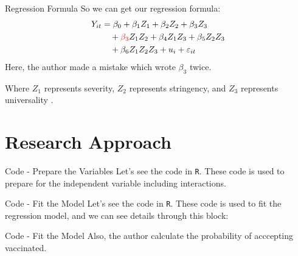 \documentclass{beamer}
\begin{document}
\begin{frame}{Regression Formula}
	So we can get our regression formula:
	\begin{align*}
		Y_{it} &= \beta_0 + \beta_1 Z_1 + \beta_2 Z_2 + \beta_3 Z_3 \\
		&\quad + \textcolor{red}{\textbf{$\beta_3$}} Z_1 Z_2 + \beta_4 Z_1 Z_3 + \beta_5 Z_2 Z_3 \\
		&\quad + \beta_6 Z_1 Z_2 Z_3 + u_i + \varepsilon_{it}
	\end{align*}
	\noindent Here, the author made a mistake which wrote $\beta_3$ twice.
	\par
	\noindent Where $Z_1$ represents severity, $Z_2$ represents stringency, and $Z_3$ represents universality \citep{hartmann2024trading}.
\end{frame}

\section{Research Approach}

\begin{frame}{Code - Prepare the Variables}
	\noindent Let's see the code in \texttt{R}. These code is used to prepare for the independent variable including interactions.
	
\end{frame}

\begin{frame}{Code - Fit the Model}
\noindent Let's see the code in \texttt{R}. These code is used to fit the regression model, and we can see details through this block:

\end{frame}

\begin{frame}{Code - Fit the Model}
\noindent Also, the author calculate the probability of acccepting vaccinated.

\end{frame}
\end{document}
